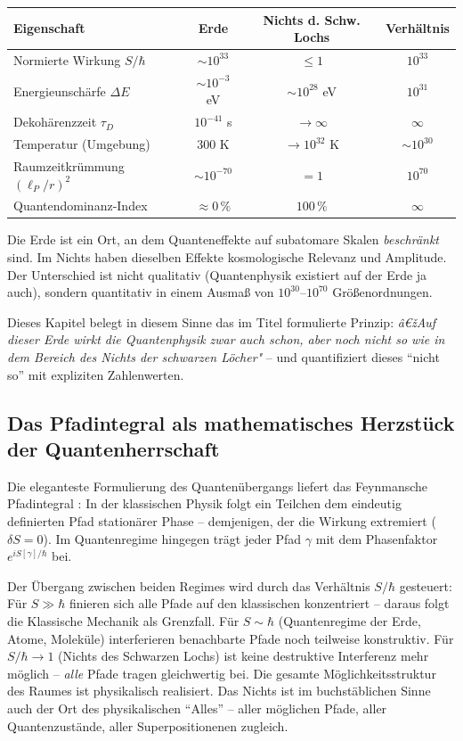 ﻿\documentclass[12pt,a4paper]{report}
\begin{document}
\begin{center}
\renewcommand{\arraystretch}{1.35}
\begin{tabular}{lccc}
    \hline
    \textbf{Eigenschaft} & \textbf{Erde} & \textbf{Nichts d. Schw. Lochs} & \textbf{Verhältnis} \\
    \hline
    Normierte Wirkung $S/\hbar$ & $\sim 10^{33}$ & $\leq 1$ & $10^{33}$ \\
    Energieunschärfe $\Delta E$ & $\sim 10^{-3}$ eV & $\sim 10^{28}$ eV & $10^{31}$ \\
    Dekohärenzzeit $\tau_D$ & $10^{-41}$ s & $\to \infty$ & $\infty$ \\
    Temperatur (Umgebung) & 300 K & $\to 10^{32}$ K & $\sim 10^{30}$ \\
    Raumzeitkrümmung $(\ell_P/r)^2$ & $\sim 10^{-70}$ & $= 1$ & $10^{70}$ \\
    Quantendominanz-Index & $\approx 0\,\%$ & $100\,\%$ & $\infty$ \\
    \hline
\end{tabular}
\renewcommand{\arraystretch}{1.0}
\end{center}

Die Erde ist ein Ort, an dem Quanteneffekte auf subatomare Skalen \emph{beschränkt} sind. Im Nichts haben dieselben Effekte kosmologische Relevanz und Amplitude. Der Unterschied ist nicht qualitativ (Quantenphysik existiert auf der Erde ja auch), sondern quantitativ in einem Ausmaß von $10^{30}$--$10^{70}$ Größenordnungen.

Dieses Kapitel belegt in diesem Sinne das im Titel formulierte Prinzip: \textit{â€žAuf dieser Erde wirkt die Quantenphysik zwar auch schon, aber noch nicht so wie in dem Bereich des Nichts der schwarzen Löcher"} -- und quantifiziert dieses "`nicht so"' mit expliziten Zahlenwerten.

\subsection{Das Pfadintegral als mathematisches Herzstück der Quantenherrschaft}

Die eleganteste Formulierung des Quantenübergangs liefert das Feynmansche Pfadintegral \cite{feynman1965}: In der klassischen Physik folgt ein Teilchen dem eindeutig definierten Pfad stationärer Phase -- demjenigen, der die Wirkung extremiert ($\delta S = 0$). Im Quantenregime hingegen trägt jeder Pfad $\gamma$ mit dem Phasenfaktor $e^{iS[\gamma]/\hbar}$ bei.

Der Übergang zwischen beiden Regimes wird durch das Verhältnis $S/\hbar$ gesteuert: Für $S \gg \hbar$ finieren sich alle Pfade auf den klassischen konzentriert -- daraus folgt die Klassische Mechanik als Grenzfall. Für $S \sim \hbar$ (Quantenregime der Erde, Atome, Moleküle) interferieren benachbarte Pfade noch teilweise konstruktiv. Für $S/\hbar \to 1$ (Nichts des Schwarzen Lochs) ist keine destruktive Interferenz mehr möglich -- \emph{alle} Pfade tragen gleichwertig bei. Die gesamte Möglichkeitsstruktur des Raumes ist physikalisch realisiert. Das Nichts ist im buchstäblichen Sinne auch der Ort des physikalischen "`Alles"' -- aller möglichen Pfade, aller Quantenzustände, aller Superpositionenen zugleich.
\end{document}
